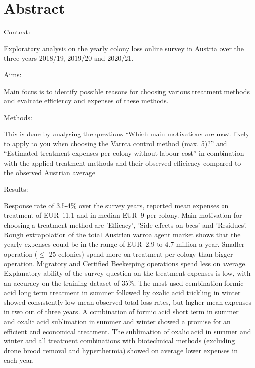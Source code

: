 \chapter*{Abstract}
\label{sec:abstract}
\vspace*{-10mm}

Context:

Exploratory analysis on the yearly colony loss online survey in Austria over the three years 2018/19, 2019/20 and 2020/21.

Aims:

Main focus is to identify possible reasons for choosing various treatment methods and evaluate efficiency and expenses of these methods.

Methods:

This is done by analysing the questions \enquote{Which main motivations are most likely to apply to you when choosing the Varroa control method (max. 5)?} and \enquote{Estimated treatment expenses per colony without labour cost} in combination with the applied treatment methods and their observed efficiency compared to the observed Austrian average.

Results:

Response rate of 3.5-4\% over the survey years, reported mean expenses on treatment of EUR~11.1 and in median EUR~9 per colony. Main motivation for choosing a treatment method are 'Efficacy', 'Side effects on bees' and 'Residues'. Rough extrapolation of the total Austrian varroa agent market shows that the yearly expenses could be in the range of EUR~2.9 to 4.7 million a year. Smaller operation ($\leq$ 25 colonies) spend more on treatment per colony than bigger operation. Migratory and Certified Beekeeping operations spend less on average. Explanatory ability of the survey question on the treatment expenses is low, with an accuracy on the training dataset of 35\%. The most used combination formic acid long term treatment in summer followed by oxalic acid trickling in winter showed consistently low mean observed total loss rates, but higher mean expenses in two out of three years. A combination of formic acid short term in summer and oxalic acid sublimation in summer and winter showed a promise for an efficient and economical treatment. The sublimation of oxalic acid in summer and winter and all treatment combinations with biotechnical methods (excluding drone brood removal and hyperthermia) showed on average lower expenses in each year.

